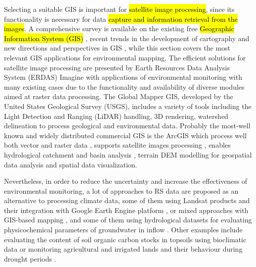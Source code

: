 \documentclass[land,article,submit,pdftex,moreauthors]{Definitions/mdpi}
\begin{document}
Selecting a suitable GIS is important for \hl{satellite image processing}, since its functionality is necessary for data \hl{capture and information retrieval from the images}. A comprehensive survey is available on the existing free \hl{Geographic Information System (GIS)} \cite{LEIDIG201549,CHEN2010253}, recent trends in the development of cartography \cite{WangWu} and new directions and perspectives in GIS \cite{Lietal2022}, while this section covers the most relevant GIS applications for environmental mapping. The efficient solutions for satellite image processing are presented by Earth Resources Data Analysis System (ERDAS) Imagine with applications of environmental monitoring \cite{FALAKI2020363} with many existing cases due to the functionality and availability of diverse modules aimed at raster data processing. The Global Mapper GIS, developed by the United States Geological Survey (USGS), includes a variety of tools including the Light Detection and Ranging (LiDAR) handling, 3D rendering, watershed delineation to process geological and environmental data. Probably the most-well known and widely distributed commercial GIS is the ArcGIS which process well both vector and raster data \cite{AlDjazouli}, supports satellite images processing \cite{SESNIE20082145}, enables hydrological catchment and basin analysis \cite{Nkiaka}, terrain DEM modelling for geospatial data analysis \cite{Kay} and spatial data visualization. 

Nevertheless, in order to reduce the uncertainty and increase the effectiveness of environmental monitoring, a lot of approaches to RS data are proposed as an alternative to processing climate data, some of them using Landsat products \cite{Lemenkova202315} and their integration with Google Earth Engine platform \cite{rs15133257}, or mixed approaches with GIS-based mapping \cite{SAIDI20091683,ANANE201236,Lemenkova202217}, and some of them using hydrological datasets for evaluating physicochemical parameters of groundwater in inflow \cite{BENBRAHIM2021104224}. Other examples include evaluating the content of soil organic carbon stocks in topsoils using bioclimatic data \cite{BAHRI2022e00561} or monitoring agricultural and irrigated lands and their behaviour during drought periods \cite{MOHAMED2023e01766}. 
\end{document}
